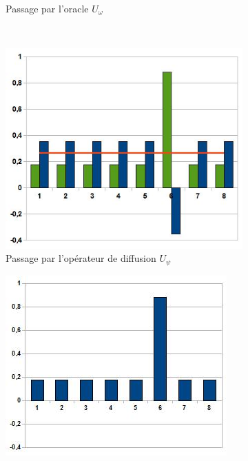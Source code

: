 \begin{figure}[ht!]
\begin{subfigure}[b]{0.40\textwidth}
            \caption{\footnotesize Passage par l'oracle $U_{\omega}$}
            \label{fig2:second}
        \end{subfigure}
        \\
        \begin{subfigure}[b]{0.40\textwidth}
            \includegraphics[width=\textwidth]{Grover-MiroirMoyenne.jpg}
            \caption{\footnotesize Passage par l'opérateur de diffusion $U_{\psi}$}\footnotemark
            \label{fig2:third}
        \end{subfigure}
        \hspace{1cm}
        \begin{subfigure}[b]{0.40\textwidth}
            \includegraphics[width=\textwidth]{Grover-Amplification.jpg}

\end{subfigure}
\end{figure}
